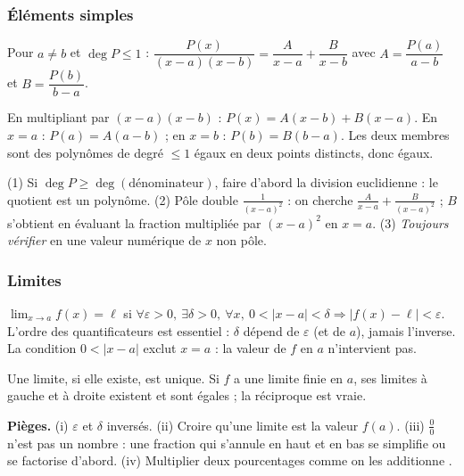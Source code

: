 \subsubsection*{Éléments simples}
\begin{propriete}
Pour $a\ne b$ et $\deg P\le1$ : $\dfrac{P(x)}{(x-a)(x-b)}=\dfrac A{x-a}+\dfrac B{x-b}$ avec $A=\dfrac{P(a)}{a-b}$ et $B=\dfrac{P(b)}{b-a}$.
\end{propriete}
\begin{demonstration}
En multipliant par $(x-a)(x-b)$ : $P(x)=A(x-b)+B(x-a)$. En $x=a$ : $P(a)=A(a-b)$ ; en $x=b$ : $P(b)=B(b-a)$. Les deux membres sont des polynômes de degré $\le1$ égaux en deux points distincts, donc égaux.
\end{demonstration}
\begin{methode}
(1) Si $\deg P\ge\deg(\text{dénominateur})$, faire d'abord la division euclidienne : le quotient est un polynôme. (2) Pôle double $\frac1{(x-a)^2}$ : on cherche $\frac A{x-a}+\frac B{(x-a)^2}$ ; $B$ s'obtient en évaluant la fraction multipliée par $(x-a)^2$ en $x=a$. (3) \emph{Toujours vérifier} en une valeur numérique de $x$ non pôle.
\end{methode}

\subsubsection*{Limites}
\begin{definition}
$\displaystyle\lim_{x\to a}f(x)=\ell$ si $\forall\varepsilon>0,\ \exists\delta>0,\ \forall x,\ 0<|x-a|<\delta\Rightarrow|f(x)-\ell|<\varepsilon$. L'ordre des quantificateurs est essentiel : $\delta$ dépend de $\varepsilon$ (et de $a$), jamais l'inverse. La condition $0<|x-a|$ exclut $x=a$ : la valeur de $f$ en $a$ n'intervient pas.
\end{definition}
\begin{propriete}
Une limite, si elle existe, est unique. Si $f$ a une limite finie en $a$, ses limites à gauche et à droite existent et sont égales ; la réciproque est vraie.
\end{propriete}
\begin{piege}
\textbf{Pièges.} (i) $\varepsilon$ et $\delta$ inversés. (ii) Croire qu'une limite est la valeur $f(a)$. (iii) $\frac00$ n'est pas un nombre : une fraction qui s'annule en haut et en bas se simplifie ou se factorise d'abord. (iv) Multiplier deux pourcentages \og comme on les additionne \fg{}.
\end{piege}

